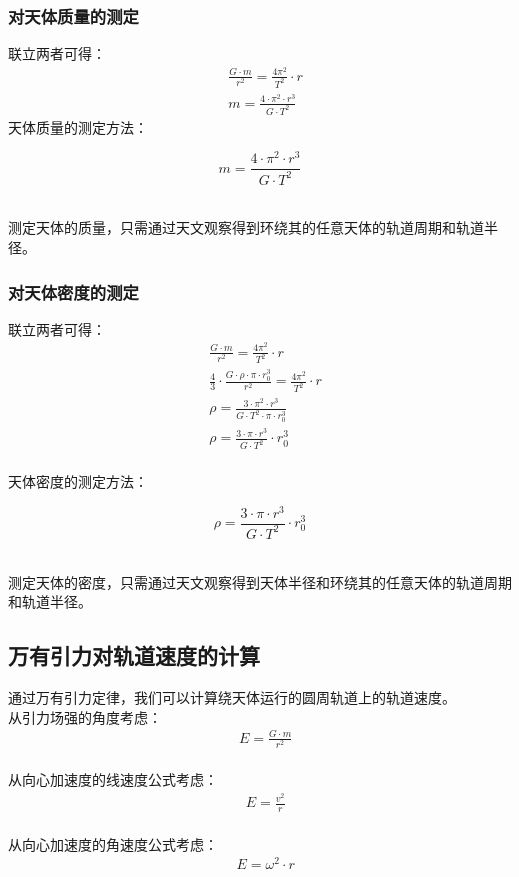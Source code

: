 \documentclass[UTF8]{ctexart}
\begin{document}
\subsubsection{对天体质量的测定}
    联立两者可得：
    \begin{align}
        &\frac{G\cdot m}{r^2}=\frac{4\pi^2}{T^2}\cdot r\\[3mm]
        &m=\frac{4\cdot\pi^2\cdot r^3}{G\cdot T^2}
    \end{align}
    天体质量的测定方法：
    \begin{large}
        \begin{equation*}
            m=\frac{4\cdot\pi^2\cdot r^3}{G\cdot T^2}
        \end{equation*}
    \end{large}\\
    测定天体的质量，只需通过天文观察得到环绕其的任意天体的轨道周期和轨道半径。

\subsubsection{对天体密度的测定}
    联立两者可得：
    \begin{align}
        &\frac{G\cdot m}{r^2}=\frac{4\pi^2}{T^2}\cdot r\\[3mm]
        &\frac{4}{3}\cdot\frac{G\cdot\rho\cdot\pi\cdot r_0^3}{r^2}=\frac{4\pi^2}{T^2}\cdot r\\[3mm]
        &\rho=\frac{3\cdot\pi^2\cdot r^3}{G\cdot T^2\cdot\pi\cdot r_0^3}\\[3mm]
        &\rho=\frac{3\cdot\pi\cdot r^3}{G\cdot T^2}\cdot r_0^3
    \end{align}\\
    天体密度的测定方法：
    \begin{large}
        \begin{equation*}
            \rho=\frac{3\cdot\pi\cdot r^3}{G\cdot T^2}\cdot r_0^3
        \end{equation*}
    \end{large}\\
    测定天体的密度，只需通过天文观察得到天体半径和环绕其的任意天体的轨道周期和轨道半径。

\newpage

\subsection{万有引力对轨道速度的计算}
    通过万有引力定律，我们可以计算绕天体运行的圆周轨道上的轨道速度。\\[3mm]
    从引力场强的角度考虑：
    \setcounter{equation}{0}
    \begin{align}
        &E=\frac{G\cdot m}{r^2}
    \end{align}\\
    从向心加速度的线速度公式考虑：
    \begin{align}
        &E=\frac{v^2}{r}
    \end{align}\\
    从向心加速度的角速度公式考虑：
    \begin{align}
        &E=\omega^2\cdot r
    \end{align}
\end{document}
